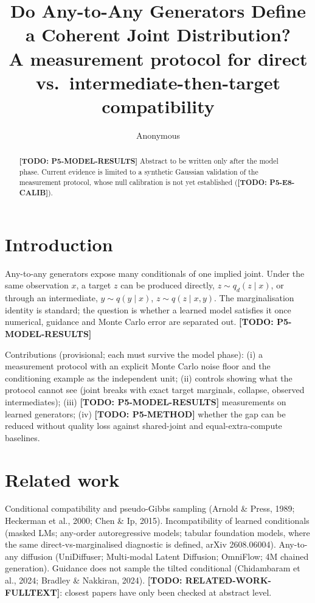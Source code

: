 \documentclass{article}
\title{Do Any-to-Any Generators Define a Coherent Joint Distribution?\\
\large A measurement protocol for direct vs.\ intermediate-then-target compatibility}
\author{Anonymous}
\newcommand{\todo}[1]{\textbf{[TODO: #1]}}
\begin{document}
\maketitle

\begin{abstract}
\todo{P5-MODEL-RESULTS} Abstract to be written only after the model phase.
Current evidence is limited to a synthetic Gaussian validation of the
measurement protocol, whose null calibration is not yet established
(\todo{P5-E8-CALIB}).
\end{abstract}

\section{Introduction}
Any-to-any generators expose many conditionals of one implied joint. Under the
same observation $x$, a target $z$ can be produced directly, $z\sim q_d(z\mid x)$,
or through an intermediate, $y\sim q(y\mid x)$, $z\sim q(z\mid x,y)$.
The marginalisation identity is standard; the question is whether a learned
model satisfies it once numerical, guidance and Monte Carlo error are
separated out. \todo{P5-MODEL-RESULTS}

Contributions (provisional; each must survive the model phase):
(i) a measurement protocol with an explicit Monte Carlo noise floor and the
conditioning example as the independent unit;
(ii) controls showing what the protocol cannot see (joint breaks with exact
target marginals, collapse, observed intermediates);
(iii) \todo{P5-MODEL-RESULTS} measurements on learned generators;
(iv) \todo{P5-METHOD} whether the gap can be reduced without quality loss
against shared-joint and equal-extra-compute baselines.

\section{Related work}
Conditional compatibility and pseudo-Gibbs sampling (Arnold \& Press, 1989;
Heckerman et al., 2000; Chen \& Ip, 2015). Incompatibility of learned
conditionals (masked LMs; any-order autoregressive models; tabular foundation
models, where the same direct-vs-marginalised diagnostic is defined, arXiv
2608.06004). Any-to-any diffusion (UniDiffuser; Multi-modal Latent Diffusion;
OmniFlow; 4M chained generation). Guidance does not sample the tilted
conditional (Chidambaram et al., 2024; Bradley \& Nakkiran, 2024).
\todo{RELATED-WORK-FULLTEXT}: closest papers have only been checked at
abstract level.
\end{document}
